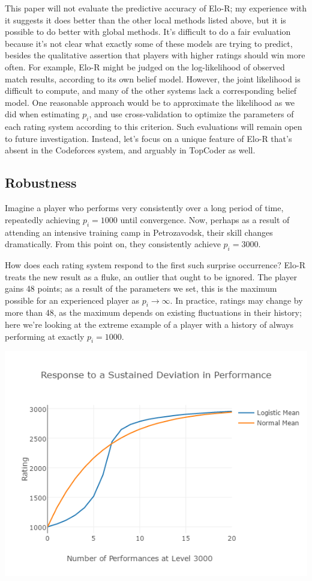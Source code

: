 \documentclass{article}
\begin{document}
This paper will not evaluate the predictive accuracy of Elo-R; my experience with it suggests it does better than the other local methods listed above, but it is possible to do better with global methods. It's difficult to do a fair evaluation because it's not clear what exactly some of these models are trying to predict, besides the qualitative assertion that players with higher ratings should win more often. For example, Elo-R might be judged on the log-likelihood of observed match results, according to its own belief model. However, the joint likelihood is difficult to compute, and many of the other systems lack a corresponding belief model. One reasonable approach would be to approximate the likelihood as we did when estimating $p_i$, and use cross-validation to optimize the parameters of each rating system according to this criterion. Such evaluations will remain open to future investigation. Instead, let's focus on a unique feature of Elo-R that's absent in the Codeforces system, and arguably in TopCoder as well.

\subsection{Robustness}

Imagine a player who performs very consistently over a long period of time, repeatedly achieving $p_i = 1000$ until convergence. Now, perhaps as a result of attending an intensive training camp in Petrozavodsk, their skill changes dramatically. From this point on, they consistently achieve $p_i = 3000$.

How does each rating system respond to the first such surprise occurrence? Elo-R treats the new result as a fluke, an outlier that ought to be ignored. The player gains 48 points; as a result of the parameters we set, this is the maximum possible for an experienced player as $p_i \rightarrow \infty$. In practice, ratings may change by more than 48, as the maximum depends on existing fluctuations in their history; here we're looking at the extreme example of a player with a history of always performing at exactly $p_i = 1000$.

\begin{center} \includegraphics[scale=0.5]{images/ResponsePlot.png} \end{center}
\end{document}

